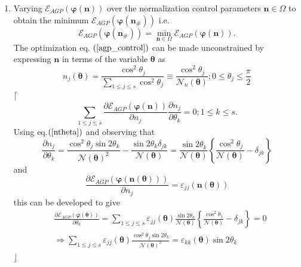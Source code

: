 \documentclass[aps,preprint]{revtex4}%
\begin{document}
\begin{enumerate}
\item Varying $\mathcal{E}_{AGP}\left(  \boldsymbol{\varphi}\left(
\boldsymbol{n}\right)  \right)  $ over the normalization control parameters
$\boldsymbol{n}\in\Omega$ to obtain the minimum $\mathcal{E}_{AGP}\left(
\boldsymbol{\varphi}\left(  \boldsymbol{n}_{\#}\right)  \right)  $ i.e.
\begin{equation}
\mathcal{E}_{AGP}\left(  \boldsymbol{\varphi}\left(  \boldsymbol{n}%
_{\#}\right)  \right)  =\min_{\boldsymbol{n}\in\Omega}\mathcal{E}_{AGP}\left(
\boldsymbol{\varphi}\left(  \boldsymbol{n}\right)  \right)  .
\label{agp_control}%
\end{equation}
The optimization eq. $\left(  \ref{agp_control}\right)  $ can be made
unconstrained by expressing $\boldsymbol{n}$ in terms of the variable
$\boldsymbol{\theta}$ as
\begin{equation}
n_{j}\left(  \boldsymbol{\theta}\right)  =\frac{\cos^{2}\theta_{j}}%
{\sum\limits_{1\leq j\leq s}\cos^{2}\theta_{j}}\equiv\frac{\cos^{2}\theta_{j}%
}{\mathcal{N}_{n}\left(  \boldsymbol{\theta}\right)  };0\leq\theta_{j}%
\leq\frac{\pi}{2} \label{ntheta}%
\end{equation}
$\lceil$%
\begin{equation}
\sum\limits_{1\leq j\leq s}\frac{\partial\mathcal{E}_{AGP}\left(
\boldsymbol{\varphi}\left(  \boldsymbol{n}\right)  \right)  }{\partial n_{j}%
}\frac{\partial n_{j}}{\partial\theta_{k}}=0;1\leq k\leq s.
\end{equation}
Using eq.$\left(  \ref{ntheta}\right)  $ and observing that
\begin{equation}
\frac{\partial n_{j}}{\partial\theta_{k}}=\frac{\cos^{2}\theta_{j}\sin
2\theta_{k}}{\mathcal{N}\left(  \boldsymbol{\theta}\right)  ^{2}}-\frac
{\sin2\theta_{k}\delta_{jk}}{\mathcal{N}\left(  \boldsymbol{\theta}\right)
}=\frac{\sin2\theta_{k}}{\mathcal{N}\left(  \boldsymbol{\theta}\right)
}\left\{  \frac{\cos^{2}\theta_{j}}{\mathcal{N}\left(  \boldsymbol{\theta
}\right)  }-\delta_{jk}\right\}
\end{equation}
and
\begin{equation}
\frac{\partial\mathcal{E}_{AGP}\left(  \boldsymbol{\varphi}\left(
\boldsymbol{n}\left(  \boldsymbol{\theta}\right)  \right)  \right)  }{\partial
n_{j}}=\varepsilon_{jj}\left(  \boldsymbol{n}\left(  \boldsymbol{\theta
}\right)  \right)
\end{equation}
this can be developed to give
\begin{align}
&  \frac{\partial\mathcal{E}_{AGP}\left(  \boldsymbol{\varphi}\left(
\boldsymbol{\theta}\right)  \right)  }{\partial\theta_{k}}=\sum\limits_{1\leq
j\leq s}\varepsilon_{jj}\left(  \boldsymbol{\theta}\right)  \frac{\sin
2\theta_{k}}{\mathcal{N}\left(  \boldsymbol{\theta}\right)  }\left\{
\frac{\cos^{2}\theta_{j}}{\mathcal{N}\left(  \boldsymbol{\theta}\right)
}-\delta_{jk}\right\}  =0\nonumber\\
&  \Rightarrow\sum\limits_{1\leq j\leq s}\varepsilon_{jj}\left(
\boldsymbol{\theta}\right)  \frac{\cos^{2}\theta_{j}\sin2\theta_{k}%
}{\mathcal{N}\left(  \boldsymbol{\theta}\right)  ^{2}}=\varepsilon_{kk}\left(
\boldsymbol{\theta}\right)  \sin2\theta_{k}%
\end{align}
$\rfloor$
\end{enumerate}
\end{document}
